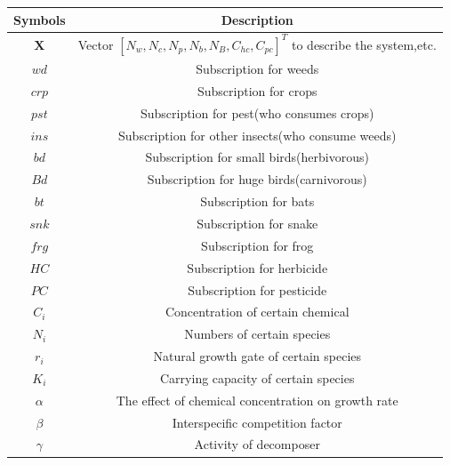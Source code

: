 \documentclass{HZNUMCM}
\begin{document}
      \begin{table}[H]
        \centering
        \begin{tabular}{cc}
          \toprule
          \rowcolor{customcolor!40} %
          Symbols & Description\\
          \midrule
          $\mathbf{X}$ & Vector $[N_w,N_c,N_p,N_b,N_B,C_{hc},C_{pc}]^T$ to describe the system,etc. \\
          $wd$ & Subscription for weeds \\
          $crp$ & Subscription for crops \\
          $pst$ & Subscription for pest(who consumes crops) \\
          $ins$ & Subscription for other insects(who consume weeds) \\
          $bd$ & Subscription for small birds(herbivorous) \\
          $Bd$ & Subscription for huge birds(carnivorous) \\
          $bt$ & Subscription for bats \\
          $snk$ & Subscription for snake \\
          $frg$ & Subscription for frog \\
          $HC$ & Subscription for herbicide \\
          $PC$ & Subscription for pesticide \\
          $C_i$ & Concentration of certain chemical \\
          $N_i$ & Numbers of certain species \\
          $r_i$ & Natural growth gate of certain species\\
          $K_i$ & Carrying capacity of certain species\\
          $\alpha$ & The effect of chemical concentration on growth rate\\
          $\beta$ & Interspecific competition factor\\
          $\gamma$ & Activity of decomposer\\
          
          \bottomrule
        \end{tabular}
        \label{tab:example}
      \end{table}

\end{document}
